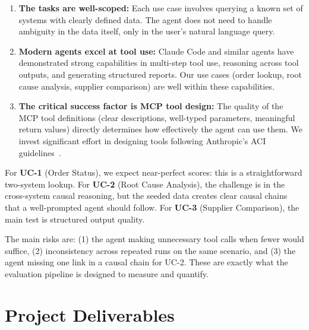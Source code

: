 \documentclass[12pt,a4paper]{report}
\begin{document}
\begin{enumerate}[itemsep=0.3em]
    \item \textbf{The tasks are well-scoped:} Each use case involves querying a known set of systems with clearly defined data. The agent does not need to handle ambiguity in the data itself, only in the user's natural language query.
    \item \textbf{Modern agents excel at tool use:} Claude Code and similar agents have demonstrated strong capabilities in multi-step tool use, reasoning across tool outputs, and generating structured reports. Our use cases (order lookup, root cause analysis, supplier comparison) are well within these capabilities.
    \item \textbf{The critical success factor is MCP tool design:} The quality of the MCP tool definitions (clear descriptions, well-typed parameters, meaningful return values) directly determines how effectively the agent can use them. We invest significant effort in designing tools following Anthropic's ACI guidelines~\cite{anthropic2025writingtools}.
\end{enumerate}

For \textbf{UC-1} (Order Status), we expect near-perfect scores: this is a straightforward two-system lookup. For \textbf{UC-2} (Root Cause Analysis), the challenge is in the cross-system causal reasoning, but the seeded data creates clear causal chains that a well-prompted agent should follow. For \textbf{UC-3} (Supplier Comparison), the main test is structured output quality.

The main risks are: (1) the agent making unnecessary tool calls when fewer would suffice, (2) inconsistency across repeated runs on the same scenario, and (3) the agent missing one link in a causal chain for UC-2. These are exactly what the evaluation pipeline is designed to measure and quantify.

\section{Project Deliverables}
\end{document}

